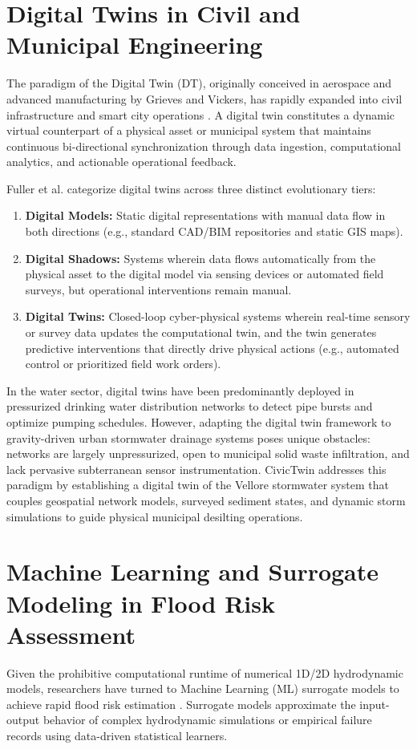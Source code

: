 \documentclass[12pt,a4paper]{report}
\begin{document}
\section{Digital Twins in Civil and Municipal Engineering}
The paradigm of the Digital Twin (DT), originally conceived in aerospace and advanced manufacturing by Grieves and Vickers, has rapidly expanded into civil infrastructure and smart city operations \cite{batty2018digital, tao2019digital}. A digital twin constitutes a dynamic virtual counterpart of a physical asset or municipal system that maintains continuous bi-directional synchronization through data ingestion, computational analytics, and actionable operational feedback.

Fuller et al. \cite{fuller2020digital} categorize digital twins across three distinct evolutionary tiers:
\begin{enumerate}
    \item \textbf{Digital Models:} Static digital representations with manual data flow in both directions (e.g., standard CAD/BIM repositories and static GIS maps).
    \item \textbf{Digital Shadows:} Systems wherein data flows automatically from the physical asset to the digital model via sensing devices or automated field surveys, but operational interventions remain manual.
    \item \textbf{Digital Twins:} Closed-loop cyber-physical systems wherein real-time sensory or survey data updates the computational twin, and the twin generates predictive interventions that directly drive physical actions (e.g., automated control or prioritized field work orders).
\end{enumerate}

In the water sector, digital twins have been predominantly deployed in pressurized drinking water distribution networks to detect pipe bursts and optimize pumping schedules. However, adapting the digital twin framework to gravity-driven urban stormwater drainage systems poses unique obstacles: networks are largely unpressurized, open to municipal solid waste infiltration, and lack pervasive subterranean sensor instrumentation. CivicTwin addresses this paradigm by establishing a digital twin of the Vellore stormwater system that couples geospatial network models, surveyed sediment states, and dynamic storm simulations to guide physical municipal desilting operations.

\section{Machine Learning and Surrogate Modeling in Flood Risk Assessment}
Given the prohibitive computational runtime of numerical 1D/2D hydrodynamic models, researchers have turned to Machine Learning (ML) surrogate models to achieve rapid flood risk estimation \cite{bermudez2018rapid, bomers2019surrogate}. Surrogate models approximate the input-output behavior of complex hydrodynamic simulations or empirical failure records using data-driven statistical learners.
\end{document}
